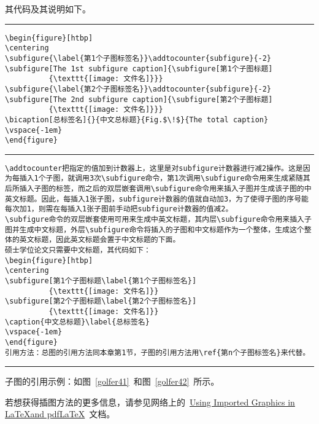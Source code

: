 其代码及其说明如下。
\vspace{1em}\noindent\hrule
\begin{verbatim}
\begin{figure}[htbp]
\centering
\subfigure{\label{第1个子图标签名}}\addtocounter{subfigure}{-2}
\subfigure[The 1st subfigure caption]{\subfigure[第1个子图标题]
          {\texttt{[image: 文件名]}}}
\subfigure{\label{第2个子图标签名}}\addtocounter{subfigure}{-2}
\subfigure[The 2nd subfigure caption]{\subfigure[第2个子图标题]
          {\texttt{[image: 文件名]}}}
\bicaption[总标签名]{}{中文总标题}{Fig.$\!$}{The total caption}
\vspace{-1em}
\end{figure}
\end{verbatim}
\noindent\hrule
\begin{verbatim}
\addtocounter把指定的值加到计数器上，这里是对subfigure计数器进行减2操作。这是因为每插入1个子图，就调用3次\subfigure命令，第1次调用\subfigure命令用来生成紧随其后所插入子图的标签，而之后的双层嵌套调用\subfigure命令用来插入子图并生成该子图的中英文标题。因此，每插入1张子图，subfigure计数器的值就自动加3，为了使得子图的序号能每次加1，则需在每插入1张子图前手动把subfigure计数器的值减2。
\subfigure命令的双层嵌套使用可用来生成中英文标题，其内层\subfigure命令用来插入子图并生成中文标题，外层\subfigure命令将插入的子图和中文标题作为一个整体，生成这个整体的英文标题，因此英文标题会置于中文标题的下面。
硕士学位论文只需要中文标题，其代码如下：
\begin{figure}[htbp]
\centering
\subfigure[第1个子图标题\label{第1个子图标签名}]
          {\texttt{[image: 文件名]}}
\subfigure[第2个子图标题\label{第2个子图标签名}]
          {\texttt{[image: 文件名]}}
\caption{中文总标题}\label{总标签名}
\vspace{-1em}
\end{figure}
引用方法：总图的引用方法同本章第1节，子图的引用方法用\ref{第n个子图标签名}来代替。
\end{verbatim}
\noindent\hrule\vspace{1em}

子图的引用示例：如图~\ref{golfer41}~和图~\ref{golfer42}~所示。

若想获得插图方法的更多信息，请参见网络上的~\href{ftp://ftp.tex.ac.uk/tex-archive/info/epslatex.pdf}{Using Imported Graphics in \LaTeX and pdf\LaTeX}~文档。 